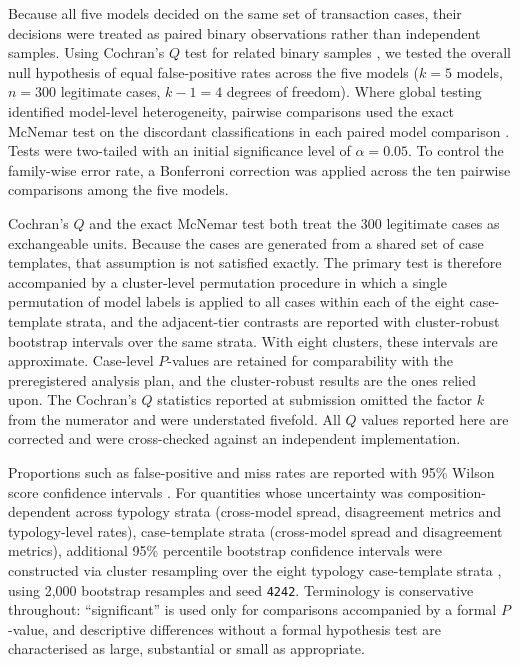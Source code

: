 \documentclass[pdflatex,sn-basic,Numbered]{sn-jnl}
\newcommand{\HLtext}[1]{\texthl{#1}}
\newcommand{\HLdel}[1]{\textcolor{HLink}{\sout{#1}}}
\renewcommand{\HLtext}[1]{#1}\renewcommand{\HLdel}[1]{#1}%
\begin{document}
Because all five models decided on the same set of transaction cases, their decisions were treated as paired binary observations rather than independent samples. Using Cochran's $Q$ test for related binary samples \cite{cochran}, we tested the overall null hypothesis of equal false-positive rates across the five models ($k=5$ models, $n=300$ legitimate cases, $k-1=4$ degrees of freedom). Where global testing identified model-level heterogeneity, pairwise comparisons used the exact McNemar test on the discordant classifications in each paired model comparison \cite{mcnemar}. Tests were two-tailed with an initial significance level of $\alpha=0.05$. To control the family-wise error rate, a Bonferroni correction was applied across the ten pairwise comparisons among the five models.

\HLtext{Cochran's} $Q$ \HLtext{and the exact McNemar test both treat the 300 legitimate cases as exchangeable units. Because the cases are generated from a shared set of case templates, that assumption is not satisfied exactly. The primary test is therefore accompanied by a cluster-level permutation procedure in which a single permutation of model labels is applied to all cases within each of the eight case-template strata, and the adjacent-tier contrasts are reported with cluster-robust bootstrap intervals over the same strata. With eight clusters, these intervals are approximate. Case-level} $P$\HLtext{-values are retained for comparability with the preregistered analysis plan, and the cluster-robust results are the ones relied upon. The Cochran's} $Q$ \HLtext{statistics reported at submission omitted the factor} $k$ \HLtext{from the numerator and were understated fivefold. All} $Q$ \HLtext{values reported here are corrected and were cross-checked against an independent implementation.}

Proportions such as false-positive and miss rates are reported with 95\% Wilson score confidence intervals \cite{wilson}. For quantities whose uncertainty was composition-dependent across \HLdel{typology strata (cross-model spread, disagreement metrics and typology-level rates),} \HLtext{case-template strata (cross-model spread and disagreement metrics),} additional 95\% percentile bootstrap confidence intervals were constructed via cluster resampling over the eight \HLdel{typology} \HLtext{case-template} strata \cite{bootstrap}, using 2{,}000 bootstrap resamples and seed \texttt{4242}. Terminology is conservative throughout: ``significant'' is used only for comparisons accompanied by a formal $P$-value, and descriptive differences without a formal hypothesis test are characterised as large, substantial or small as appropriate.
\end{document}
